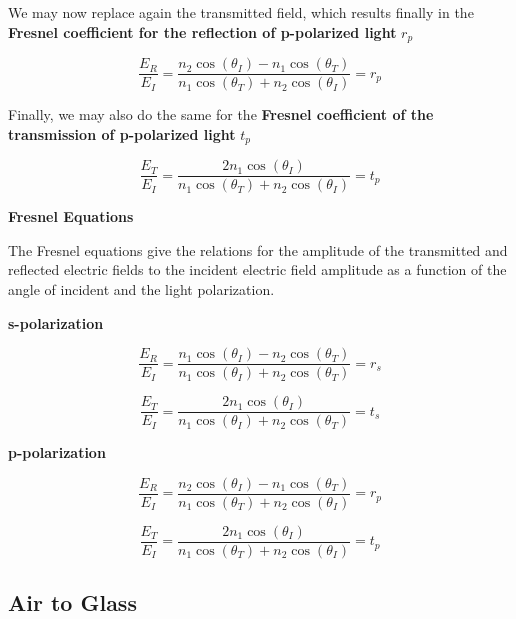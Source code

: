 \documentclass[
  a4paper,
]{book}
\begin{document}
We may now replace again the transmitted field, which results finally in
the \textbf{Fresnel coefficient for the reflection of p-polarized light}
\(r_p\)

\[
\frac{E_R}{E_I}=\frac{n_2\cos(\theta_I)-n_1\cos(\theta_T)}{n_1\cos(\theta_T)+n_2\cos(\theta_I)}=r_p
\]

Finally, we may also do the same for the \textbf{Fresnel coefficient of
the transmission of p-polarized light} \(t_p\)

\[
\frac{E_T}{E_I}=\frac{2n_1\cos(\theta_I)}{n_1\cos(\theta_T)+n_2\cos(\theta_I)}=t_p
\]

\begin{tcolorbox}[enhanced jigsaw, coltitle=black, title=\textcolor{quarto-callout-note-color}{\faInfo}\hspace{0.5em}{Note}, colframe=quarto-callout-note-color-frame, toprule=.15mm, opacitybacktitle=0.6, left=2mm, opacityback=0, breakable, toptitle=1mm, bottomtitle=1mm, leftrule=.75mm, arc=.35mm, titlerule=0mm, colbacktitle=quarto-callout-note-color!10!white, rightrule=.15mm, bottomrule=.15mm, colback=white]

\textbf{Fresnel Equations}

The Fresnel equations give the relations for the amplitude of the
transmitted and reflected electric fields to the incident electric field
amplitude as a function of the angle of incident and the light
polarization.

\textbf{s-polarization}

\[
\frac{E_R}{E_I}=\frac{n_1\cos(\theta_I)-n_2\cos(\theta_T)}{n_1\cos(\theta_I)+n_2\cos(\theta_T)}=r_s
\tag{Fresnel Coefficient $r_s$}
\]

\[
\frac{E_T}{E_I}=\frac{2n_1\cos(\theta_I)}{n_1\cos(\theta_I)+n_2\cos(\theta_T)}=t_s
\tag{Fresnel Coefficient $t_s$}
\]

\textbf{p-polarization}

\[
\frac{E_R}{E_I}=\frac{n_2\cos(\theta_I)-n_1\cos(\theta_T)}{n_1\cos(\theta_T)+n_2\cos(\theta_I)}=r_p
\tag{Fresnel Coefficient $r_p$}
\]

\[
\frac{E_T}{E_I}=\frac{2n_1\cos(\theta_I)}{n_1\cos(\theta_T)+n_2\cos(\theta_I)}=t_p
\tag{Fresnel Coefficient $t_p$}
\]

\end{tcolorbox}

\subsection{Air to Glass}\label{air-to-glass}
\end{document}
